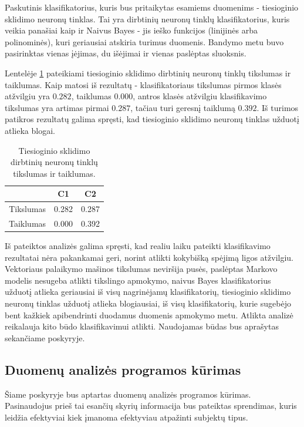 \documentclass[]{vgtuef}
\begin{document}
Paskutinis klasifikatorius, kuris bus pritaikytas esamiems duomenims - tiesioginio sklidimo neuronų tinklas. Tai yra dirbtinių neuronų tinklų klasifikatorius, kuris veikia panašiai kaip ir Naivus Bayes - jis ieško funkcijos (linijinės arba polinominės), kuri geriausiai atskiria turimus duomenis. Bandymo metu buvo pasirinktas vienas įėjimas, du išėjimai ir vienas paslėptas sluoksnis. 

Lentelėje \ref{table:ffn_scores} pateikiami tiesioginio sklidimo dirbtinių neuronų tinklų tikslumas ir taiklumas. Kaip matosi iš rezultatų - klasifikatoriaus tikslumas pirmos klasės atžvilgiu yra $0.282$, taiklumas $0.000$, antros klasės atžvilgiu klasifikavimo tikslumas yra artimas pirmai $0.287$, tačiau turi geresnį taiklumą $0.392$. Iš turimos patikros rezultatų galima spręsti, kad tiesioginio sklidimo neuronų tinklas užduotį atlieka blogai.

\begin{table}[!t]
  \centering
  \caption{Tiesioginio sklidimo dirbtinių neuronų tinklų tikslumas ir taiklumas.}
  \label{table:ffn_scores}
  \begin{tabular}{|c|c|c|} \hline
    & C1 & C2 \\ \hline
    Tikslumas & 0.282 & 0.287 \\ \hline
    Taiklumas & 0.000 & 0.392 \\ \hline
  \end{tabular}
\end{table}

Iš pateiktos analizės galima spręsti, kad realiu laiku pateikti klasifikavimo rezultatai nėra pakankamai geri, norint atlikti kokybišką spėjimą ligos atžvilgiu. Vektoriaus palaikymo mašinos tikslumas neviršija pusės, paslėptas Markovo modelis nesugeba atlikti tikslingo apmokymo, naivus Bayes klasifikatorius užduotį atlieka geriausiai iš visų nagrinėjamų klasifikatorių, tiesioginio sklidimo neuronų tinklas užduotį atlieka blogiausiai, iš visų klasifikatorių, kurie sugebėjo bent kažkiek apibendrinti duodamus duomenis apmokymo metu. Atlikta analizė reikalauja kito būdo klasifikavimui atlikti. Naudojamas būdas bus aprašytas sekančiame poskyryje.

\subsection{Duomenų analizės programos kūrimas}

Šiame poskyryje bus aptartas duomenų analizės programos kūrimas. Pasinaudojus prieš tai esančių skyrių informacija bus pateiktas sprendimas, kuris leidžia efektyviai kiek įmanoma efektyviau atpažinti subjektų tipus.
\end{document}
